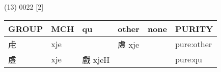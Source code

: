 \documentclass[14pt,a4paper]{scrartcl}
\begin{document}
(13) 0022 {[}2{]}

\begin{longtable}[c]{@{}llllll@{}}
\toprule
\begin{minipage}[b]{0.14\columnwidth}\raggedright\strut
GROUP
\strut\end{minipage} &
\begin{minipage}[b]{0.14\columnwidth}\raggedright\strut
MCH
\strut\end{minipage} &
\begin{minipage}[b]{0.14\columnwidth}\raggedright\strut
qu
\strut\end{minipage} &
\begin{minipage}[b]{0.14\columnwidth}\raggedright\strut
other
\strut\end{minipage} &
\begin{minipage}[b]{0.14\columnwidth}\raggedright\strut
none
\strut\end{minipage} &
\begin{minipage}[b]{0.14\columnwidth}\raggedright\strut
PURITY
\strut\end{minipage}\tabularnewline
\midrule
\endhead
\begin{minipage}[t]{0.14\columnwidth}\raggedright\strut
虍
\strut\end{minipage} &
\begin{minipage}[t]{0.14\columnwidth}\raggedright\strut
xje
\strut\end{minipage} &
\begin{minipage}[t]{0.14\columnwidth}\raggedright\strut
\strut\end{minipage} &
\begin{minipage}[t]{0.14\columnwidth}\raggedright\strut
䖒 xje
\strut\end{minipage} &
\begin{minipage}[t]{0.14\columnwidth}\raggedright\strut
\strut\end{minipage} &
\begin{minipage}[t]{0.14\columnwidth}\raggedright\strut
pure:other
\strut\end{minipage}\tabularnewline
\begin{minipage}[t]{0.14\columnwidth}\raggedright\strut
䖒
\strut\end{minipage} &
\begin{minipage}[t]{0.14\columnwidth}\raggedright\strut
xje
\strut\end{minipage} &
\begin{minipage}[t]{0.14\columnwidth}\raggedright\strut
戲 xjeH
\strut\end{minipage} &
\begin{minipage}[t]{0.14\columnwidth}\raggedright\strut
\strut\end{minipage} &
\begin{minipage}[t]{0.14\columnwidth}\raggedright\strut
\strut\end{minipage} &
\begin{minipage}[t]{0.14\columnwidth}\raggedright\strut
pure:qu
\strut\end{minipage}\tabularnewline
\bottomrule
\end{longtable}
\end{document}
